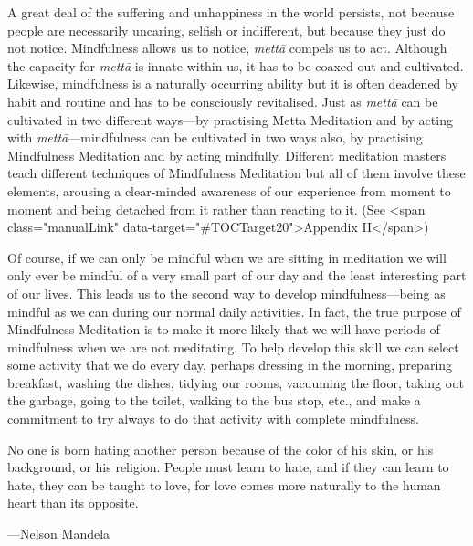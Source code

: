 \documentclass[10pt, openright]{book}
\newenvironment{epigram-2}%
{%
\vspace{1em}
\noindent
\quoting[leftmargin=2.5cm,rightmargin=2.5cm]%
\begin{itshape}
\large
}%
{\end{itshape}\endquoting
}%
\newenvironment{epigram-2-cite}%
{%
\quoting[leftmargin=2.5cm,rightmargin=2.5cm]%
\noindent\normal\hspace*{\fill} 
}%
{\endquoting\vspace{1em}
}%
\begin{document}
A great deal of the suffering and unhappiness in the world persists, not because people are necessarily uncaring, selfish or indifferent, but because they just do not notice. Mindfulness allows us to notice, \textit{mettā} compels us to act. Although the capacity for \textit{mettā} is innate within us, it has to be coaxed out and cultivated. Likewise, mindfulness is a naturally occurring ability but it is often deadened by habit and routine and has to be consciously revitalised. Just as \textit{mettā} can be cultivated in two different ways—by practising Metta Meditation and by acting with \textit{mettā}—mindfulness can be cultivated in two ways also, by practising Mindfulness Meditation and by acting mindfully. Different meditation masters teach different techniques of Mindfulness Meditation but all of them involve these elements, arousing a clear-minded awareness of our experience from moment to moment and being detached from it rather than reacting to it. (See <span class="manualLink" data-target="#TOCTarget20">Appendix II</span>)


Of course, if we can only be mindful when we are sitting in meditation we will only ever be mindful of a very small part of our day and the least interesting part of our lives. This leads us to the second way to develop mindfulness—being as mindful as we can during our normal daily activities. In fact, the true purpose of Mindfulness Meditation is to make it more likely that we will have periods of mindfulness when we are not meditating. To help develop this skill we can select some activity that we do every day, perhaps dressing in the morning, preparing breakfast, washing the dishes, tidying our rooms, vacuuming the floor, taking out the garbage, going to the toilet, walking to the bus stop, etc., and make a commitment to try always to do that activity with complete mindfulness.


\begin{epigram-2}
No one is born hating another person because of the color of his skin, or his background, or his religion. People must learn to hate, and if they can learn to hate, they can be taught to love, for love comes more naturally to the human heart than its opposite.
\end{epigram-2}

\begin{epigram-2-cite}
—Nelson Mandela
\end{epigram-2-cite}
\end{document}
